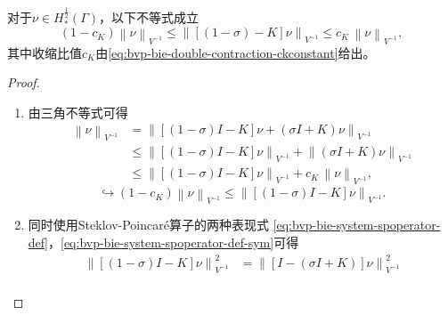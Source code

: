 \begin{corollary}[位移双层位势的收缩比率]
  \label{corollary:bvp-bie-shifted-double-contraction-extention-gamma}
  对于$\nu \in H_{*}^{\frac{1}{2}}(\Gamma)$，以下不等式成立
  \begin{equation}
    \label{eq:bvp-bie-shifted-double-contraction-extention-gamma}
    \left(1 - c_{K} \right)
    \left\| \nu \right\|_{V^{-1}}
    \le
    \left\|
    \left[ \left(1-\sigma \right) -K \right] \nu
    \right\|_{V^{-1}}
    \le
    c_{K} \, \left\| \nu \right\|_{V^{-1}},
  \end{equation}
  其中收缩比值$c_{K}$由\eqref{eq:bvp-bie-double-contraction-ckconstant}给出。
\end{corollary}
\begin{proof}
  \begin{enumerate}
    \item 由三角不等式可得
    \begin{equation*}
      \begin{split}
      \left\| \nu \right\|_{V^{-1}}
      & = \left\|
      \left[
      \left( 1- \sigma \right) I - K
      \right] \nu
      + \left( \sigma I + K \right) \nu
      \right\|_{V^{-1}} \\
      & \le
      \left\|
      \left[
      \left( 1- \sigma \right) I - K
      \right] \nu
      \right\|_{V^{-1}} +
      \left\|
      \left( \sigma I + K \right) \nu
      \right\|_{V^{-1}} \\
      & \le
      \left\|
      \left[
      \left( 1- \sigma \right) I - K
      \right] \nu
      \right\|_{V^{-1}} +
      c_{K} \, \left\| \nu \right\|_{V^{-1}},
    \end{split}
  \end{equation*}
  \begin{equation*}
    \hookrightarrow \left(1 - c_{K} \right)
    \left\| \nu \right\|_{V^{-1}}
    \le
    \left\|
      \left[
      \left( 1- \sigma \right) I - K
      \right] \nu
    \right\|_{V^{-1}}.
  \end{equation*}
  \item 同时使用Steklov-Poincaré算子的两种表现式   \eqref{eq:bvp-bie-system-spoperator-def}，\eqref{eq:bvp-bie-system-spoperator-def-sym}可得
  \begin{equation*}
    \begin{split}
      \left\|
        \left[
        \left( 1- \sigma \right) I - K
        \right] \nu
      \right\|_{V^{-1}}^2
      & =
      \left\|
      \left[
      I - \left( \sigma I + K \right)
      \right] \nu
      \right\|_{V^{-1}}^{2} \\

\end{split}
\end{equation*}
\end{enumerate}
\end{proof}

